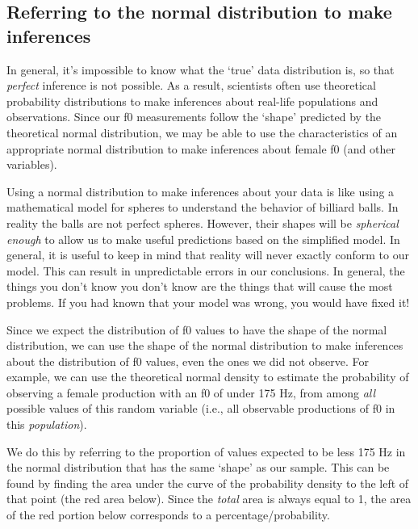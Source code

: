 \documentclass[
]{book}
\begin{document}
\hypertarget{referring-to-the-normal-distribution-to-make-inferences}{%
\subsection{Referring to the normal distribution to make inferences}\label{referring-to-the-normal-distribution-to-make-inferences}}

In general, it's impossible to know what the `true' data distribution is, so that \emph{perfect} inference is not possible. As a result, scientists often use theoretical probability distributions to make inferences about real-life populations and observations. Since our f0 measurements follow the `shape' predicted by the theoretical normal distribution, we may be able to use the characteristics of an appropriate normal distribution to make inferences about female f0 (and other variables).

Using a normal distribution to make inferences about your data is like using a mathematical model for spheres to understand the behavior of billiard balls. In reality the balls are not perfect spheres. However, their shapes will be \emph{spherical enough} to allow us to make useful predictions based on the simplified model. In general, it is useful to keep in mind that reality will never exactly conform to our model. This can result in unpredictable errors in our conclusions. In general, the things you don't know you don't know are the things that will cause the most problems. If you had known that your model was wrong, you would have fixed it!

Since we expect the distribution of f0 values to have the shape of the normal distribution, we can use the shape of the normal distribution to make inferences about the distribution of f0 values, even the ones we did not observe. For example, we can use the theoretical normal density to estimate the probability of observing a female production with an f0 of under 175 Hz, from among \emph{all} possible values of this random variable (i.e., all observable productions of f0 in this \emph{population}).

We do this by referring to the proportion of values expected to be less 175 Hz in the normal distribution that has the same `shape' as our sample. This can be found by finding the area under the curve of the probability density to the left of that point (the red area below). Since the \emph{total} area is always equal to 1, the area of the red portion below corresponds to a percentage/probability.
\end{document}
